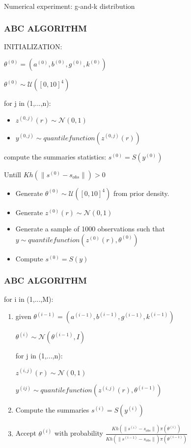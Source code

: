\documentclass{beamer}
\begin{document}
\begin{section}{Numerical experiment: g-and-k distribution}
\begin{frame}
\end{frame}

\begin{frame}
	\frametitle{ABC ALGORITHM}
	
	INITIALIZATION:
	
	$\theta^{(0)}=(a^{(0)},b^{(0)},g^{(0)},k^{(0)})$
	
	$ \theta^{(0)} \sim \mathcal{U}([0,10]^{4})$
	
	for j in (1,...,n):
	
	\begin{itemize}
		\item $z^{(0,j)}(r) \sim \mathcal{N}(0,1)  $
		
		\item $ y^{(0,j)} \sim quantile function(z^{(0,j)}(r))$
	\end{itemize}
	compute the summaries statistics:
	$ s^{(0)} =S(y^{(0)})$
	
	Untill $Kh(\|s^{(0)}-s_{obs}\|)>0$
	\begin{itemize}
		\item Generate $\theta^{(0)} \sim \mathcal{U}([0,10]^{4})$ from prior density.
		\item Generate $z^{(0)}(r) \sim \mathcal{N}(0,1)$
		\item Generate a sample of 1000 observations such that $y \sim quantile function(z^{(0)}(r),\theta^{(0)})$
		\item Compute $s^{(0)}=S(y)$
	\end{itemize}
	
\end{frame}

\begin{frame}
	\frametitle{ABC ALGORITHM}
	
	
	for i in (1,...,M):
	\begin{enumerate}
		\item given $\theta^{(i-1)}=(a^{(i-1)},b^{(i-1)},g^{(i-1)},k^{(i-1)})$
		
		$\theta^{(i)} \sim \mathcal{N}(\theta^{(i-1)},I)$
		
		for j in (1,...,n):
		
		$z^{(i,j)}(r) \sim \mathcal{N}(0,1)$
		
		$ y^{(ij)} \sim quantile function(z^{(i,j)}(r), \theta^{(i-1)})$
		
		
		\item Compute the summaries  $ s^{(i)} =S(y^{(i)})$
		
		\item Accept $\theta^{(i)}$ with probability $\frac{Kh(\|s^{(i)}-s_{obs}\|)\pi(\theta^{(i)})}{Kh(\|s^{(i-1)}-s_{obs}\|)\pi(\theta^{(i-1)})}$
		

\end{enumerate}
\end{frame}
\end{section}
\end{document}
